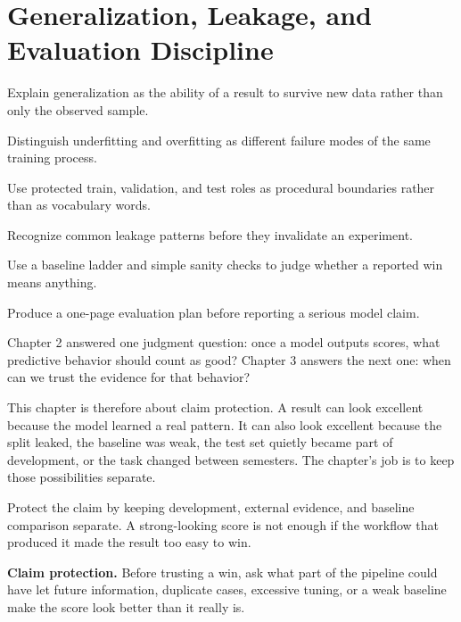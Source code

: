 \chapter{Generalization, Leakage, and Evaluation Discipline}

\begin{learninggoals}
\item Explain generalization as the ability of a result to survive new data rather than only the observed sample.
\item Distinguish underfitting and overfitting as different failure modes of the same training process.
\item Use protected train, validation, and test roles as procedural boundaries rather than as vocabulary words.
\item Recognize common leakage patterns before they invalidate an experiment.
\item Use a baseline ladder and simple sanity checks to judge whether a reported win means anything.
\item Produce a one-page evaluation plan before reporting a serious model claim.
\end{learninggoals}

Chapter 2 answered one judgment question: once a model outputs scores, what predictive behavior should count as good? Chapter 3 answers the next one: when can we trust the evidence for that behavior?

This chapter is therefore about claim protection. A result can look excellent because the model learned a real pattern. It can also look excellent because the split leaked, the baseline was weak, the test set quietly became part of development, or the task changed between semesters. The chapter's job is to keep those possibilities separate.

\begin{problemsolvinglens}
Protect the claim by keeping development, external evidence, and baseline comparison separate. A strong-looking score is not enough if the workflow that produced it made the result too easy to win.
\end{problemsolvinglens}

\begin{thinkingtool}
\textbf{Claim protection.} Before trusting a win, ask what part of the pipeline could have let future information, duplicate cases, excessive tuning, or a weak baseline make the score look better than it really is.
\end{thinkingtool}

